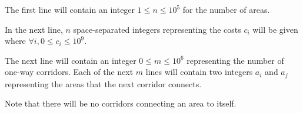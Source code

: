 The first line will contain an integer $1 \leq n \leq 10^{5}$ for the number of areas. 

In the next line, $n$ space-separated integers representing the costs $c_i$ will be given where $\forall i, 0 \leq c_i \leq 10^{9}$.

The next line will contain an integer $0 \leq m \leq 10^{6}$ representing the number of one-way corridors. 
Each of the next $m$ lines will contain two integers $a_i$ and $a_j$ representing the areas that the next corridor connects.

Note that there will be no corridors connecting an area to itself.